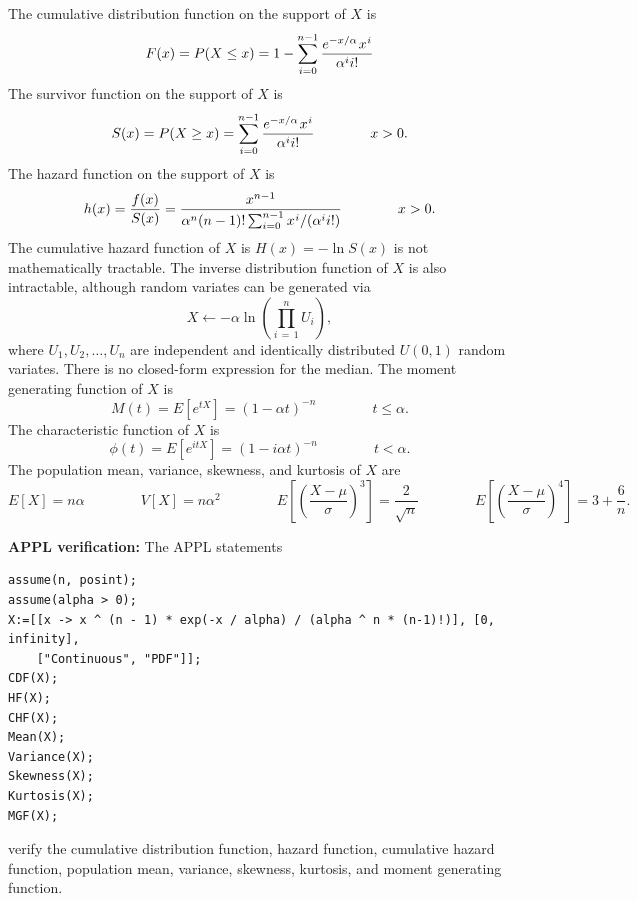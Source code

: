 \documentclass[12pt,fullpage]{article}
\begin{document}
\noindent
The cumulative distribution function on the support of $X$ is
$$
F(x) = P(X \le x) =1 - \sum_{i = 0} ^ {n - 1} \frac{e ^ {-x / \alpha} \kern 0.08 em x ^ {\kern 0.04 em i}} {\alpha ^ {i} i!}
$$
The survivor function on the support of $X$ is
$$
S(x) = P(X \ge x) =\sum_{i=0}^{n-1}\frac{e^{-x / \alpha}\kern 0.08 em x ^ {\kern 0.04 em i}} {\alpha ^ {i} i!} \qquad \qquad x > 0.
$$
The hazard function on the support of $X$ is
$$
h(x) = \frac{f(x)}{S(x)} =
\frac{x ^ {n - 1}}{\alpha ^ n (n - 1)! \sum_{i=0}^{n-1} x ^ {\kern 0.04 em i}/(\alpha ^ {i} i!)}
\qquad \qquad x > 0.
$$
The cumulative hazard function of $X$ is $H(x) = -\ln S(x)$ is not mathematically tractable. 
The inverse distribution function of $X$ is also intractable,
although random variates can be generated via
$$
X \leftarrow - \alpha \ln \left( \prod_{i\,=\,1}^n U_i \right),
$$
where $U_1, U_2, \ldots, U_n$ are independent and identically distributed $U(0, 1)$ random variates.
There is no closed-form expression for the median.
The moment generating function of $X$ is
$$
M(t) = E\left[ e ^ {tX} \right] = \left( 1 - \alpha t \right) ^ {-n} \qquad \qquad t \le \alpha.
$$
The characteristic function of $X$ is
$$
\phi(t) = E\left[ e ^ {itX} \right] = (1 - i \alpha t) ^ {-n}  \qquad \qquad t < \alpha.
$$
The population mean, variance, skewness, and kurtosis of $X$ are
$$
E[X] = n \alpha \qquad \qquad 
V[X] = n \alpha ^ {2} \qquad \qquad 
E\left[ \left( \frac{X - \mu}{\sigma} \right) ^ 3 \right] = \frac{2}{\sqrt{n}} \qquad \qquad 
E\left[ \left( \frac{X - \mu}{\sigma} \right) ^ 4 \right] = 3 +\frac{6}{n}.
$$

\vspace{0.1in}

\noindent
{\bf APPL verification:}
The APPL statements
\begin{verbatim}
assume(n, posint);
assume(alpha > 0);
X:=[[x -> x ^ (n - 1) * exp(-x / alpha) / (alpha ^ n * (n-1)!)], [0, infinity],
    ["Continuous", "PDF"]];
CDF(X);
HF(X);
CHF(X);
Mean(X);
Variance(X);
Skewness(X);
Kurtosis(X);
MGF(X);
\end{verbatim}
verify the cumulative distribution function, hazard function, cumulative hazard function, population mean, variance, skewness, kurtosis, and moment generating function.
\end{document}
